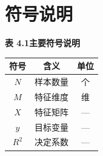 \section{符号说明}

\newpage
\begin{center}
  {\fontsize{12pt}{14.4pt}\heiti\bfseries 表 4.1\quad 主要符号说明}\\[0.6em]
  \begin{tabular}{ccc}
    \toprule
    \textbf{符号} & \textbf{含义} & \textbf{单位} \\
    \midrule
    $N$   & 样本数量 & 个 \\
    $M$   & 特征维度 & 维 \\
    $X$   & 特征矩阵 & --- \\
    $y$   & 目标变量 & --- \\
    $R^2$ & 决定系数 & --- \\
    \bottomrule
  \end{tabular}
\end{center}

